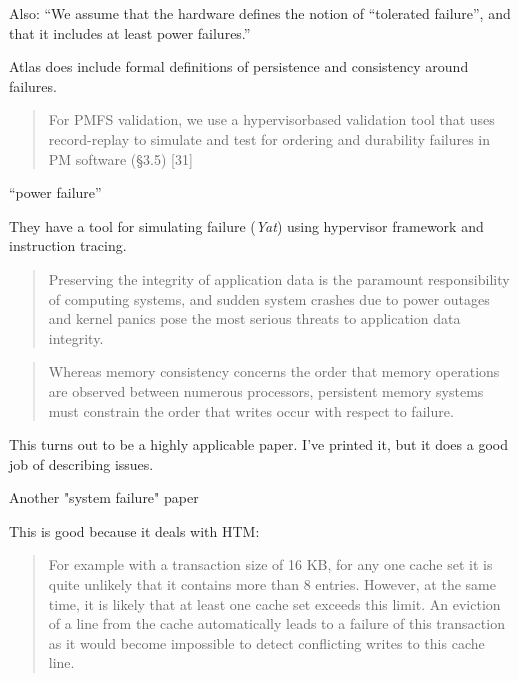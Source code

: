 Also: ``We assume that the hardware defines the notion of “tolerated failure”, and
that it includes at least power failures.''

Atlas does include formal definitions of persistence and consistency around failures.

\cite{dulloor2014system}

\begin{quotation}
For PMFS validation, we use a hypervisorbased
validation tool that uses record-replay to simulate
and test for ordering and durability failures in PM software
(§3.5) [31]
\end{quotation}

``power failure''

They have a tool for simulating failure (\textit{Yat}) using hypervisor framework and instruction tracing.

\cite{park2013failure}

\begin{quotation}
    Preserving the integrity of application data is the paramount
    responsibility of computing systems, and sudden system
    crashes due to power outages and kernel panics pose the
    most serious threats to application data integrity.
\end{quotation}

\cite{pelley2014memory}

\begin{quotation}
    Whereas memory
consistency concerns the order that memory operations
are observed between numerous processors, persistent memory
systems must constrain the order that writes occur with
respect to failure.
\end{quotation}

This turns out to be a highly applicable paper.  I've printed it, but it does a good job of describing
issues.

\cite{lu2014loose}

Another "system failure" paper

This is good because it deals with HTM: \cite{leis2014exploiting}

\begin{quotation}
    For example with a transaction size of 16 KB, for any
one cache set it is quite unlikely that it contains more than 8
entries. However, at the same time, it is likely that at least
one cache set exceeds this limit. An eviction of a line from
the cache automatically leads to a failure of this transaction
as it would become impossible to detect conflicting writes to
this cache line.
\end{quotation}

